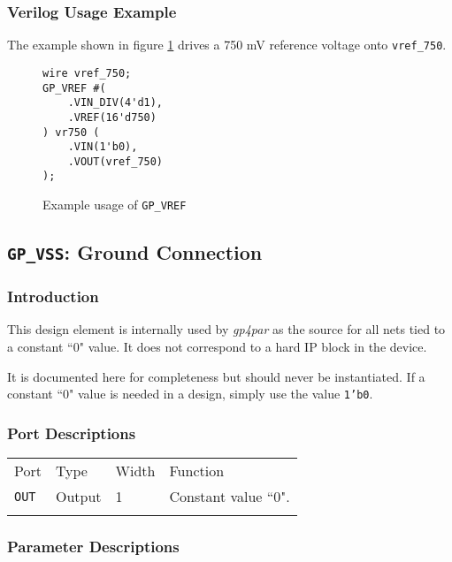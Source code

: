 \documentclass[11pt]{article}
\newcommand{\namestyle}[1]{\textit{#1}}
\newcommand{\tokenstyle}[1]{\texttt{#1}}
\newcommand{\wirestyle}[1]{\texttt{#1}}
\newcommand{\datastyle}[1]{\texttt{#1}}
\newcommand{\whenstyle}[1]{{\fontseries{sb}\selectfont#1}}
\newcommand{\thinhline}{\Xhline{1\arrayrulewidth}}
\newcommand{\thickhline}{\Xhline{2.5\arrayrulewidth}}
\begin{document}
\subsubsection{Verilog Usage Example}

The example shown in figure \ref{gp-vref-example} drives a 750 mV reference voltage onto \wirestyle{vref\_750}.

\begin{figure}[h]
\begin{lstlisting}
wire vref_750;
GP_VREF #(
	.VIN_DIV(4'd1),
	.VREF(16'd750)
) vr750 (
	.VIN(1'b0),
	.VOUT(vref_750)
);
\end{lstlisting}
\caption{Example usage of \tokenstyle{GP\_VREF}}
\label{gp-vref-example}
\end{figure}


\clearpage
\pagebreak
\subsection{\tokenstyle{GP\_VSS}: Ground Connection}

\subsubsection{Introduction}
This design element is internally used by \namestyle{gp4par} as the source for all nets tied to a constant ``0" value. It does not correspond to a hard IP block in the device.

It is documented here for completeness but should never be instantiated. If a constant ``0" value is needed in a
design, simply use the value \datastyle{1'b0}.

\subsubsection{Port Descriptions}

\begin{tabularx}{\textwidth}{lllX}
\thinhline
\whenstyle{Port} & \whenstyle{Type} & \whenstyle{Width} & \whenstyle{Function} \\
\thickhline
\tokenstyle{OUT} & Output & 1 & Constant value ``0". \\
\thinhline
\end{tabularx}

\subsubsection{Parameter Descriptions}
\end{document}
